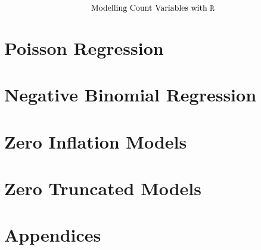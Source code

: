 \documentclass{beamer}
\begin{document}
\begin{frame}
	\huge
	\[ \mbox{Modelling Count Variables with \texttt{R} } \]
	\end{frame}





\section{Poisson Regression}




% 

\section{Negative Binomial Regression}



\section{Zero Inflation Models}

% 


% 
\section{Zero Truncated Models}




\section*{Appendices}

\end{document}
